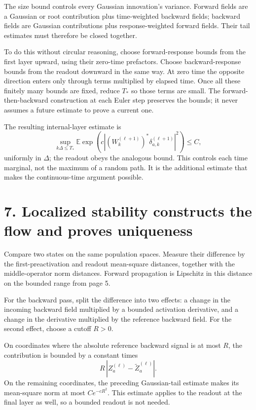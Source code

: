 The size bound controls every Gaussian innovation's variance. Forward fields
are a Gaussian or root contribution plus time-weighted backward fields;
backward fields are Gaussian contributions plus response-weighted forward
fields. Their tail estimates must therefore be closed together.

To do this without circular reasoning, choose forward-response bounds from the first
layer upward, using their zero-time prefactors. Choose backward-response
bounds from the readout downward in the same way. At zero time the opposite
direction enters only through terms multiplied by elapsed time. Once all
these finitely many bounds are fixed, reduce $T_*$ so those terms are small.
The forward-then-backward construction at each Euler step preserves the
bounds; it never assumes a future estimate to prove a current one.

The resulting internal-layer estimate is
\[
\sup_{k\Delta\le T_*}\mathbb E\exp\!\left(
c\left|(W_k^{(\ell+1)})^*\delta_{a,k}^{(\ell+1)}\right|^2\right)
\le C,
\]
uniformly in $\Delta$; the readout obeys the analogous bound. This controls
each time marginal, not the maximum of a random path. It is the additional
estimate that makes the continuous-time argument possible.

\newpage
\section*{7. Localized stability constructs the flow and proves uniqueness}

Compare two states on the same population spaces. Measure their difference
by the first-preactivation and readout mean-square distances, together with
the middle-operator norm distances. Forward propagation is Lipschitz in
this distance on the bounded range from page 5.

For the backward pass, split the difference into two effects: a change in
the incoming backward field multiplied by a bounded activation derivative,
and a change in the derivative multiplied by the reference backward field.
For the second effect, choose a cutoff $R>0$.

On coordinates where the absolute reference backward signal is at most $R$,
the contribution is bounded by a constant times
\[
R\,|Z_a^{(\ell)}-\widetilde Z_a^{(\ell)}|.
\]
On the remaining coordinates, the preceding Gaussian-tail estimate makes
its mean-square norm at most $Ce^{-cR^2}$. This estimate applies to the
readout at the final layer as well, so a bounded readout is not needed.

